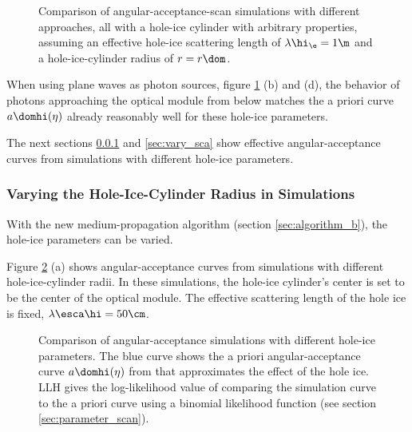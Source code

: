 \begin{figure}[htbp]
  \hfill
  \hfill
  \hfill
  \hfill
  \caption{Comparison of angular-acceptance-scan simulations with different approaches, all with a hole-ice cylinder with arbitrary properties, assuming an effective hole-ice scattering length of $\lambda\hi_\e=1\m$ and a hole-ice-cylinder radius of $r=r\dom$.}
  \label{fig:eVapie9t}
\end{figure}

When using plane waves as photon sources, figure \ref{fig:eVapie9t} (b) and (d), the behavior of photons approaching the optical module from below matches the a priori curve $a\domhi(\eta)$ \cite{icepaper} already reasonably well for these hole-ice parameters.

The next sections \ref{sec:vary_radius} and \ref{sec:vary_sca} show effective angular-acceptance curves from simulations with different hole-ice parameters.


\subsubsection{Varying the Hole-Ice-Cylinder Radius in Simulations}
\label{sec:vary_radius}

With the new medium-propagation algorithm (section \ref{sec:algorithm_b}), the hole-ice parameters can be varied.


Figure \ref{fig:neiyi3Al} (a) shows angular-acceptance curves from simulations with different hole-ice-cylinder radii. In these simulations, the hole-ice cylinder's center is set to be the center of the optical module. The effective scattering length of the hole ice is fixed, $\lambda\esca\hi = 50\cm$.

\begin{figure}[htbp]
  \hfill
  \hfill
  \caption{Comparison of angular-acceptance simulations with different hole-ice parameters. The blue curve shows the a priori angular-acceptance curve $a\domhi(\eta)$ from \cite{icepaper} that approximates the effect of the hole ice. LLH gives the log-likelihood value of comparing the simulation curve to the a priori curve using a binomial likelihood function (see section \ref{sec:parameter_scan}).}
  \label{fig:neiyi3Al}
\end{figure}

